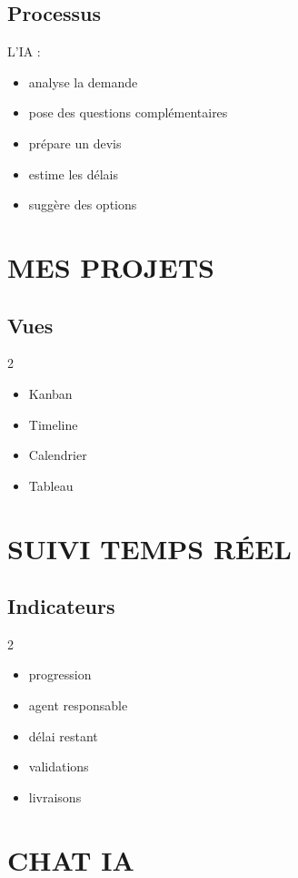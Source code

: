 \documentclass[12pt,a4paper,oneside]{book}
\begin{document}
\section{Processus}
L'IA :
\begin{itemize}
\item analyse la demande
\item pose des questions complémentaires
\item prépare un devis
\item estime les délais
\item suggère des options
\end{itemize}

\chapter{MES PROJETS}

\section{Vues}
\begin{multicols}{2}
\begin{itemize}
\item Kanban
\item Timeline
\item Calendrier
\item Tableau
\end{itemize}
\end{multicols}

\chapter{SUIVI TEMPS RÉEL}

\section{Indicateurs}
\begin{multicols}{2}
\begin{itemize}
\item progression
\item agent responsable
\item délai restant
\item validations
\item livraisons
\end{itemize}
\end{multicols}

\chapter{CHAT IA}
\end{document}
